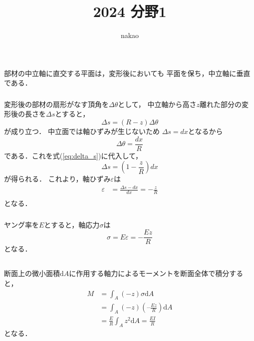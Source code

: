 \documentclass[a4paper]{jsarticle}
\begin{document}
\title{2024 分野1}
\author{nakao}
\maketitle

\section{}
\subsection{}
\subsubsection{}
部材の中立軸に直交する平面は，変形後においても
平面を保ち，中立軸に垂直である．
\subsubsection{}
変形後の部材の扇形がなす頂角を$\Delta \theta$として，
中立軸から高さ$z$離れた部分の変形後の長さを$\Delta s$とすると，
\begin{equation}
  \label{eq:delta_s}
  \Delta s = (R - z) \Delta \theta
\end{equation}
が成り立つ．
中立面では軸ひずみが生じないため
$\Delta s = dx$となるから
\begin{equation}
  \Delta \theta = \frac{dx}{R}
\end{equation}
である．これを式(\ref{eq:delta_s})に代入して，
\begin{equation}
  \Delta s = \left(1 - \frac{z}{R}\right) dx
\end{equation}
が得られる．
これより，軸ひずみ$\varepsilon$は
\begin{align}
  \varepsilon & = \frac{\Delta s - dx}{dx} = -\frac{z}{R} \\
\end{align}
となる．

\subsubsection{}
ヤング率を$E$とすると，軸応力$\sigma$は
\begin{equation}
  \sigma = E \varepsilon
  = -\frac{Ez}{R}
\end{equation}
となる．

\subsection{}
断面上の微小面積$\mathrm{d}A$に作用する軸力によるモーメントを断面全体で積分すると，
\begin{equation}
  \label{eq:moment}
  \begin{aligned}
    M & = \int_A (-z) \sigma \mathrm{d}A                       \\
      & = \int_A (-z) \left(–\frac{E z}{R}\right) \mathrm{d} A \\
      & = \frac{E}{R} \int_A z^2 \mathrm{d} A
    = \frac{E I}{R}
  \end{aligned}
\end{equation}
となる．
\end{document}
